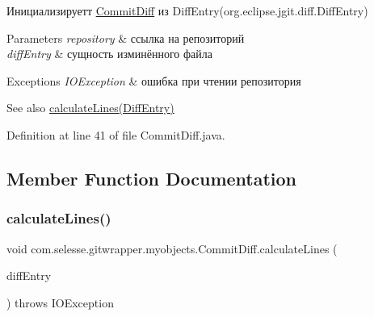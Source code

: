 Инициализируетт \hyperlink{classcom_1_1selesse_1_1gitwrapper_1_1myobjects_1_1_commit_diff}{Commit\+Diff} из Diff\+Entry(org.\+eclipse.\+jgit.\+diff.\+Diff\+Entry)


\begin{DoxyParams}{Parameters}
{\em repository} & ссылка на репозиторий \\
\hline
{\em diff\+Entry} & сущность изминённого файла \\
\hline
\end{DoxyParams}

\begin{DoxyExceptions}{Exceptions}
{\em I\+O\+Exception} & ошибка при чтении репозитория \\
\hline
\end{DoxyExceptions}
\begin{DoxySeeAlso}{See also}
\hyperlink{classcom_1_1selesse_1_1gitwrapper_1_1myobjects_1_1_commit_diff_a1c992f15988559996bbbab6f54eee4ef}{calculate\+Lines(\+Diff\+Entry)} 
\end{DoxySeeAlso}


Definition at line 41 of file Commit\+Diff.\+java.



\subsection{Member Function Documentation}
\mbox{\label{classcom_1_1selesse_1_1gitwrapper_1_1myobjects_1_1_commit_diff_a1c992f15988559996bbbab6f54eee4ef}} 
\subsubsection{\texorpdfstring{calculate\+Lines()}{calculateLines()}}
{\footnotesize\ttfamily void com.\+selesse.\+gitwrapper.\+myobjects.\+Commit\+Diff.\+calculate\+Lines (\begin{DoxyParamCaption}\item[{Diff\+Entry}]{diff\+Entry }\end{DoxyParamCaption}) throws I\+O\+Exception\hspace{0.3cm}{\ttfamily [private]}}

